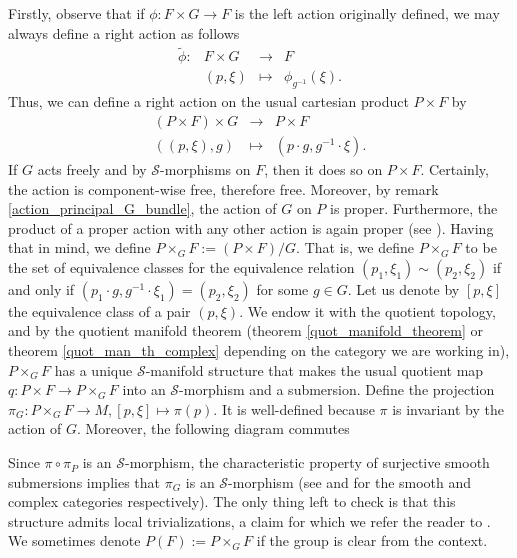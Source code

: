 Firstly, observe that if \(\phi\colon F \times G \to F\) is the left action originally defined, we may always define a right action as follows
\begin{equation} \label{eq_nueva_accion}
\begin{array}{cccc}
    \tilde{\phi}\colon& F \times G & \longrightarrow & F\\
    & (p, \xi) & \mapsto & \phi_{g^{-1}}(\xi).
\end{array}
\end{equation}
Thus, we can define a right action on the usual cartesian product \(P \times F\) by
\[
\begin{array}{ccc}
    (P\times F) \times G & \longrightarrow & P \times F \\
    ((p,\xi), g) & \mapsto & (p\cdot g, g^{-1}\cdot \xi).
\end{array}
\]
If \(G\) acts freely and by \(\mathcal{S}\)-morphisms on \(F\), then it does so on \(P \times F\). Certainly, the action is component-wise free, therefore free. Moreover, by remark \ref{action_principal_G_bundle}, the action of \(G\) on \(P\) is proper. Furthermore, the product of a proper action with any other action is again proper (see \parencite[Remark 6.3.9]{rudolph2012differential}). Having that in mind, we define \(P\times_G F:=(P\times F)/G\). That is, we define \(P\times_GF\) to be the set of equivalence classes for the equivalence relation \((p_1, \xi_1) \sim (p_2, \xi_2)\) if and only if \((p_1 \cdot g, g^{-1}\cdot \xi_1)=(p_2, \xi_2)\) for some \(g \in G\). Let us denote by \([p, \xi]\) the equivalence class of a pair \((p, \xi)\). We endow it with the quotient topology, and by the quotient manifold theorem (theorem \ref{quot_manifold_theorem} or theorem \ref{quot_man_th_complex} depending on the category we are working in), \(P \times_G F\) has a unique \(\mathcal{S}\)-manifold structure that makes the usual quotient map \(q\colon P\times F \to P\times_GF\) into an \(\mathcal{S}\)-morphism and a submersion. Define the projection \(\pi_G\colon P \times_GF \to M, [p, \xi] \mapsto \pi(p)\). It is well-defined because \(\pi\) is invariant by the action of \(G\). Moreover, the following diagram commutes
\begin{center}
\end{center}
Since \(\pi \circ \pi_P\) is an \(\mathcal{S}\)-morphism, the characteristic property of surjective smooth submersions implies that \(\pi_G\) is an \(\mathcal{S}\)-morphism (see \parencite[Th. 4.29]{lee_introSM} and \parencite[Cor. 2.6]{lee_introCM} for the smooth and complex categories respectively). The only thing left to check is that this structure admits local trivializations, a claim for which we refer the reader to \parencite[Sec. 1.2]{Rudolph_2017pug}. We sometimes denote \(P(F):=P\times_GF\) if the group is clear from the context.

